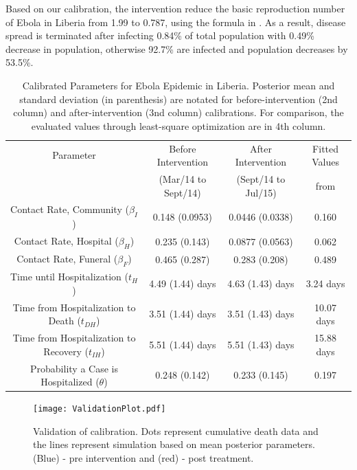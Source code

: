 Based on our calibration, the intervention reduce the basic reproduction number of Ebola in Liberia from 1.99 to 0.787, using the formula in \cite{Legrand2007}. As a result, disease spread is terminated after infecting 0.84\% of total population with 0.49\% decrease in population, otherwise 92.7\% are infected and population decreases by 53.5\%.\\

\begin{table}[ht]
\caption{Calibrated Parameters for Ebola Epidemic in Liberia. Posterior mean and standard deviation (in parenthesis) are notated for before-intervention (2nd column) and after-intervention (3nd column) calibrations. For comparison, the evaluated values through least-square optimization \cite{Rivers2014} are in 4th column.} %
\centering %
\begin{tabular}{c c c c}
\hline\hline %
Parameter &  Before Intervention  & After Intervention & Fitted Values\\ [0.5ex]
 & (Mar/14 to Sept/14) &  (Sept/14 to Jul/15) & from \cite{Rivers2014}\\ [0.5ex] %
\hline %
{Contact Rate, Community  (${\beta_{I}}$) }& {0.148 (0.0953)} & {0.0446 (0.0338)} & 0.160 \\
Contact Rate, Hospital  ($\beta_{H}$) & 0.235 (0.143) & 0.0877 (0.0563) & 0.062\\
Contact Rate, Funeral  ($\beta_{F}$) & 0.465 (0.287)& 0.283 (0.208) & 0.489 \\
Time until Hospitalization (${t_{H}}$) & 4.49 (1.44) days & 4.63 (1.43) days & 3.24 days  \\
Time from Hospitalization to Death (${t_{DH}}$) & 3.51 (1.44) days & 3.51 (1.43) days  & 10.07 days\\
Time from Hospitalization to Recovery (${t_{IH}}$) & 5.51 (1.44) days & 5.51 (1.43) days  & 15.88 days\\
Probability a Case is Hospitalized ($\theta$) & 0.248 (0.142) & 0.233 (0.145) & 0.197\\
[1ex]
\hline
\end{tabular}
\label{tab:calibratedParameters}
\end{table}

\begin{figure}[h]
  \centering
  \texttt{[image: ValidationPlot.pdf]}
  \caption{Validation of calibration. Dots represent cumulative death data and the lines represent simulation based on mean posterior parameters. (Blue) - pre intervention and (red) - post treatment.}
\label{fig:Cumulative _Death}
\end{figure}






